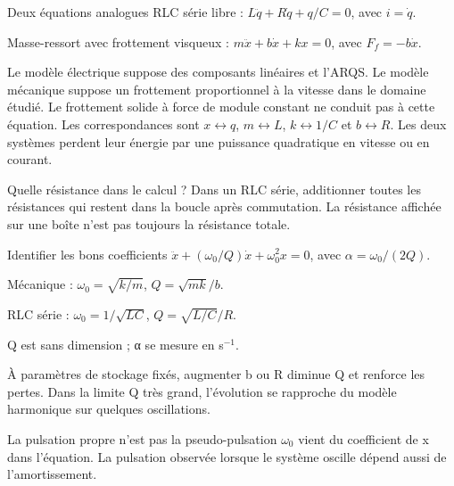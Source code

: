 \begin{loi}{Deux équations analogues}
RLC série libre : $L\ddot q+R\dot q+q/C=0$, avec $i=\dot q$.\par Masse-ressort avec frottement visqueux : $m\ddot x+b\dot x+kx=0$, avec $F_f=-b\dot x$.
\end{loi}
Le modèle électrique suppose des composants linéaires et l’ARQS. Le modèle mécanique suppose un frottement proportionnel à la vitesse dans le domaine étudié. Le frottement solide à force de module constant ne conduit pas à cette équation.
Les correspondances sont $x\leftrightarrow q$, $m\leftrightarrow L$, $k\leftrightarrow1/C$ et $b\leftrightarrow R$. Les deux systèmes perdent leur énergie par une puissance quadratique en vitesse ou en courant.
\begin{methode}{Quelle résistance dans le calcul ?}
Dans un RLC série, additionner toutes les résistances qui restent dans la boucle après commutation. La résistance affichée sur une boîte n’est pas toujours la résistance totale.
\end{methode}


\begin{loi}{Identifier les bons coefficients}
$\ddot x+(\omega_0/Q)\dot x+\omega_0^2x=0$, avec $\alpha=\omega_0/(2Q)$.\par Mécanique : $\omega_0=\sqrt{k/m}$, $Q=\sqrt{mk}/b$.\par RLC série : $\omega_0=1/\sqrt{LC}$, $Q=\sqrt{L/C}/R$.\par Q est sans dimension ; α se mesure en s$^{-1}$.
\end{loi}
À paramètres de stockage fixés, augmenter b ou R diminue Q et renforce les pertes. Dans la limite Q très grand, l’évolution se rapproche du modèle harmonique sur quelques oscillations.
\begin{piege}{La pulsation propre n’est pas la pseudo-pulsation}
$\omega_0$ vient du coefficient de x dans l’équation. La pulsation observée lorsque le système oscille dépend aussi de l’amortissement.
\end{piege}


